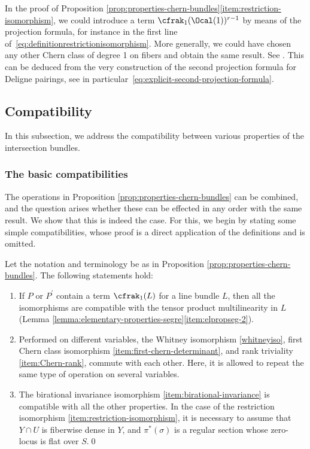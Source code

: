 \begin{remark}\label{rem:restriction-iso-chern-class-degree-1}
In the proof of Proposition \ref{prop:properties-chern-bundles}\eqref{item:restriction-isomorphism}, we could introduce a term $\cfrak_{1}(\Ocal(1))^{r-1}$ by means of the projection formula, for instance in the first line of~\eqref{eq:definitionrestrictionisomorphism}. More generally, we could have chosen any other Chern class of degree 1 on fibers and obtain the same result. See \cite[\textsection V.4.10]{Elkikfib}. This can be deduced from the very construction of the second projection formula for Deligne pairings, see in parti\-cu\-lar~\eqref{eq:explicit-second-projection-formula}.
\end{remark}

\subsection{Compatibility}\label{subsec:compatibility}
In this subsection, we address the compatibility between various properties of the intersection bundles.

\subsubsection{The basic compatibilities}\label{subsubsec:basic-compatibilites}
The operations in Proposition \ref{prop:properties-chern-bundles} can be combined, and the question arises whether these can be effected in any order with the same result. We show that this is indeed the case. For this, we begin by stating some simple compatibilities, whose proof is a direct application of the definitions and is omitted.

\begin{proposition}\label{prop:stupid-compatibilities}
Let the notation and terminology be as in Proposition \ref{prop:properties-chern-bundles}. The following statements hold:
\begin{enumerate}
\item If $P$ or $P^{\prime}$ contain a term $\cfrak_{1}(L)$ for a line bundle $L$, then all the isomorphisms are compatible with the tensor product multilinearity in $L$ (\cf Lemma \ref{lemma:elementary-properties-segre}\eqref{item:elpropseg-2}).
\item Performed on different variables, the Whitney isomorphism \eqref{whitneyiso}, first Chern class isomorphism \eqref{item:first-chern-determinant}, and rank triviality \eqref{item:Chern-rank}, commute with each other. Here, it is allowed to repeat the same type of operation on several variables.
\item\label{item:birational-comp} The birational invariance isomorphism \eqref{item:birational-invariance} is compatible with all the other properties. In the case of the restriction isomorphism \eqref{item:restriction-isomorphism}, it is necessary to assume that $Y \cap U$ is fiberwise dense in $Y$, and $\pi^{\ast}(\sigma)$ is a regular section whose zero-locus is flat over $S$.\qed
\end{enumerate}
\end{proposition}

